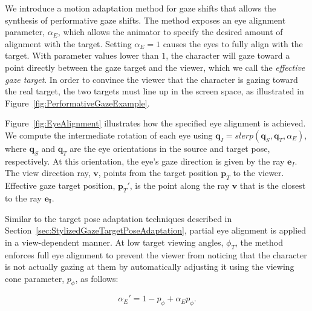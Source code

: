 We introduce a motion adaptation method for gaze shifts that allows the synthesis of performative gaze shifts. The method exposes an eye alignment parameter, $\alpha_E$, which allows the animator to specify the desired amount of alignment with the target. Setting $\alpha_E = 1$ causes the eyes to fully align with the target. 
With parameter values lower than $1$, the character will gaze toward a point directly between the gaze target and the viewer, which we call the \textit{effective gaze target}. In order to convince the viewer that the character is gazing toward the real target, the two targets must line up in the screen space, as illustrated in Figure~\ref{fig:PerformativeGazeExample}.

Figure~\ref{fig:EyeAlignment} illustrates how the specified eye alignment is achieved. We compute the intermediate rotation of each eye using $\mathbf{q}_I = slerp (\mathbf{q}_S, \mathbf{q}_T, \alpha_E )$, where $\mathbf{q}_S$ and $\mathbf{q}_T$ are the eye orientations in the source and target pose, respectively. At this orientation, the eye's gaze direction is given by the ray $\mathbf{e}_I$. The view direction ray, $\mathbf{v}$, points from the target position $\mathbf{p}_T$ to the viewer. Effective gaze target position, $\mathbf{p}_T'$, is the point along the ray $\mathbf{v}$ that is the closest to the ray $\mathbf{e_I}$.

Similar to the target pose adaptation techniques described in Section~\ref{sec:StylizedGazeTargetPoseAdaptation}, partial eye alignment is applied in a view-dependent manner. At low target viewing angles, $\phi_T$, the method enforces full eye alignment to prevent the viewer from noticing that the character is not actually gazing at them by automatically adjusting it using the viewing cone parameter, $p_{\phi}$, as follows:

\begin{equation}
\alpha_E' = 1 - p_{\phi} + \alpha_E p_{\phi}.
\end{equation}